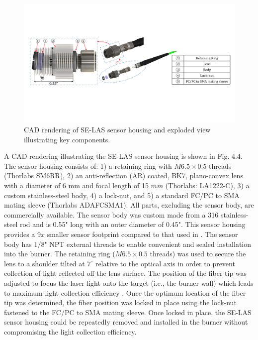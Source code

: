  \begin{figure}[h]
    \centering
        \includegraphics[trim = 0mm 52mm 0mm 20mm, clip=true, width=1\textwidth]{fig/ch4_fig2.pdf}
        \caption{CAD rendering of SE-LAS sensor housing and exploded view illustrating key components.}
    \label{fig:ch4_4}
\end{figure}


A CAD rendering illustrating the SE-LAS sensor housing is shown in Fig. 4.4. The sensor housing consists of: 1) a retaining ring with $M6.5\times 0.5$ threads (Thorlabs SM6RR), 2) an anti-reflection (AR) coated, BK7, plano-convex lens with a diameter of 6 mm and focal length of 15 $mm$ (Thorlabs: LA1222-C), 3) a custom stainless-steel body, 4) a lock-nut, and 5) a standard FC/PC to SMA mating sleeve (Thorlabs ADAFCSMA1). All parts, excluding the sensor body, are commercially available. The sensor body was custom made from a 316 stainless-steel rod and is 0.55" long with an outer diameter of 0.45". This sensor housing provides a 9$x$ smaller sensor footprint compared to that used in \cite{Goldenstein:16}. The sensor body has $1/8$" NPT external threads to enable convenient and sealed installation into the burner. The retaining ring ($M6.5 \times 0.5$ threads) was used to secure the lens to a shoulder tilted at $7^{\circ}$ relative to the optical axis in order to prevent collection of light reflected off the lens surface. The position of the fiber tip was adjusted to focus the laser light onto the target (i.e., the burner wall) which leads to maximum light collection efficiency \cite{Goldenstein:16}. Once the optimum location of the fiber tip was determined, the fiber position was locked in place using the lock-nut fastened to the FC/PC to SMA mating sleeve. Once locked in place, the SE-LAS sensor housing could be repeatedly removed and installed in the burner without compromising the light collection efficiency.


